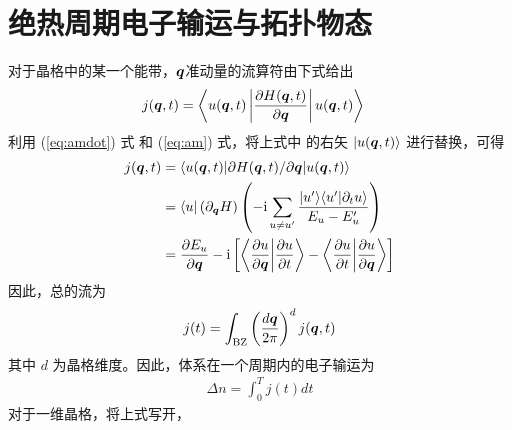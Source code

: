 \section{绝热周期电子输运与拓扑物态}\label{sec:topocp}
对于晶格中的某一个能带，$\boldsymbol{q}$准动量的流算符由下式给出
\begin{align}
j(\boldsymbol{q}, t) &= \left\langle u(\boldsymbol{q}, t)\left|\dfrac{\partial H(\boldsymbol{q}, t)}{\partial\boldsymbol{q}} \right|u(\boldsymbol{q}, t)\right\rangle
\end{align}
利用 (\ref{eq:amdot}) 式 和 (\ref{eq:am}) 式，将上式中 的右矢 $|u(\boldsymbol{q}, t)\rangle$ 进行替换，可得
\begin{align}
j(\boldsymbol{q}, t)
&= \langle u(\boldsymbol{q},t)|\partial H(\boldsymbol{q},t)/\partial\boldsymbol{q}|u(\boldsymbol{q},t)\rangle \\
&= \langle u|\left(\partial_{\boldsymbol{q}} H\right) \left(-\mathrm{i}\sum_{u\neq u'}\dfrac{|u'\rangle\langle u'|\partial_t u\rangle}{E_u - E_u'}\right) \\
&= \dfrac{\partial E_u}{\partial\boldsymbol{q}} - \mathrm{i}\left[\left\langle\dfrac{\partial u}{\partial \boldsymbol{q}}\bigg|\dfrac{\partial u}{\partial t}\right\rangle - \left\langle\dfrac{\partial u}{\partial t}\bigg|\dfrac{\partial u}{\partial \boldsymbol{q}}\right\rangle\right]
\end{align}
因此，总的流为
\begin{align}
j(t) = \int_{\text{BZ}}\left(\frac{d\boldsymbol{q}}{2\pi}\right)^{d} j(\boldsymbol{q}, t)
\end{align}
其中 $d$ 为晶格维度。因此，体系在一个周期内的电子输运为
\begin{align}
\Delta n = \int_0^Tj(t)dt
\end{align}
对于一维晶格，将上式写开，
